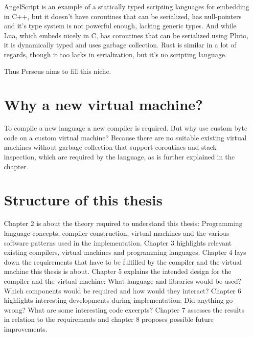 	AngelScript\cite{angelscript} is an example of a statically typed scripting languages for embedding in C++, but it doesn't have coroutines that can be serialized, has null-pointers and it's type system is not powerful enough, lacking generic types. And while Lua\cite{lua}, which embeds nicely in C, has coroutines that can be serialized using Pluto\cite{pluto}, it is dynamically typed and uses garbage collection. Rust\cite{rust} is similar in a lot of regards, though it too lacks in serialization, but it's no scripting language.
	
	Thus Perseus aims to fill this niche.
	
	\section{Why a new virtual machine?}
	
	To compile a new language a new compiler is required. But why use custom byte code on a custom virtual machine? Because there are no suitable existing virtual machines without garbage collection that support coroutines and stack inspection, which are required by the language, as is further explained in the  chapter.
	
	\section{Structure of this thesis}
	
	Chapter 2 is about the theory required to understand this thesis: Programming language concepts, compiler construction, virtual machines and the various software patterns used in the implementation. Chapter 3 highlights relevant existing compilers, virtual machines and programming languages. Chapter 4 lays down the requirements that have to be fulfilled by the compiler and the virtual machine this thesis is about. Chapter 5 explains the intended design for the compiler and the virtual machine: What language and libraries would be used? Which components would be required and how would they interact? Chapter 6 highlights interesting developments during implementation: Did anything go wrong? What are some interesting code excerpts? Chapter 7 assesses the results in relation to the requirements and chapter 8 proposes possible future improvements.
